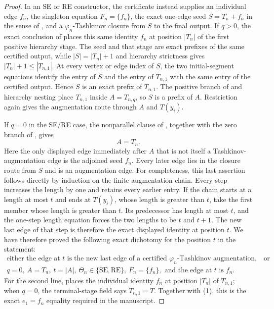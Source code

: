 \begin{proof}
In an SE or RE constructor, the certificate instead supplies an
individual edge $f_n$, the singleton equation $F_n=\{f_n\}$, the exact
one-edge seed $S=T_n+f_n$ in the sense of
, and a $\varphi_n$-Tashkinov closure from
$S$ to the final output.  If $q>0$, the exact conclusion of
 places this same identity $f_n$
at position $|T_n|$ of the first positive hierarchy stage.  The seed and
that stage are exact prefixes of the same certified output, while
$|S|=|T_n|+1$ and hierarchy strictness gives
$|T_n|+1\leq |T_{n,1}|$.  At every vertex or edge index of $S$, the two
initial-segment equations identify the entry of $S$ and the entry of
$T_{n,1}$ with the same entry of the certified output.  Hence $S$ is an
exact prefix of $T_{n,1}$.  The positive branch of
 and hierarchy nesting place
$T_{n,1}$ inside $A=T_{n,q}$, so $S$ is a prefix of $A$.  Restriction
again gives the augmentation route through $A$ and $T(y_i)$.

If $q=0$ in the SE/RE case, the nonparallel clause of
, together with the zero branch of
, gives
\[
                              A=T_n.                           \tag{1}
\]
Here the only displayed edge immediately after $A$ that is not itself a
Tashkinov-augmentation edge is the adjoined seed $f_n$.  Every later
edge lies in the closure route from $S$ and is an augmentation edge.
For completeness, this last assertion follows directly by induction on
the finite augmentation chain.  Every step increases the length by one
and retains every earlier entry.  If the chain starts at a length at
most $t$ and ends at $T(y_i)$, whose length is greater than $t$, take
the first member whose length is greater than $t$.  Its predecessor has
length at most $t$, and the one-step length equation forces the two
lengths to be $t$ and $t+1$.  The new last edge of that step is therefore
the exact displayed identity at position $t$.
We have therefore proved the following exact dichotomy for the position
$t$ in the statement:
\[
 \begin{array}{l}
 \text{either the edge at }t\text{ is the new last edge of a certified }
 \varphi_n\text{-Tashkinov augmentation,}\quad\text{or}\\[1mm]
 q=0,\ A=T_n,\ t=|A|,\ \Theta_n\in\{\mathrm{SE},\mathrm{RE}\},
 \ F_n=\{f_n\},\text{ and the edge at }t\text{ is }f_n.
 \end{array}                                                   \tag{2}
\]
For the second line,  places the
individual identity $f_n$ at position $|T_n|$ of $T_{n,1}$; when $q=0$,
the terminal-stage field says $T_{n,1}=T$.  Together with (1), this is the
exact $e_1=f_n$ equality required in the manuscript.


\end{proof}
